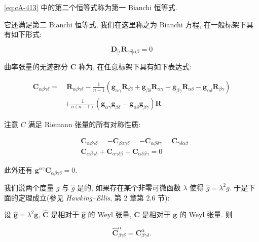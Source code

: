 \eqref{eq:cA-413} 中的第二个恒等式称为第一 Bianchi 恒等式.

它还满足第二 Bianchi 恒等式, 我们在这里称之为 Bianchi 方程, 在一般标架下具有如下形式:

\begin{equation}
\mathbf{D}_{[\epsilon}\mathbf{R}_{\gamma\delta]\alpha\beta} = 0\label{eq:cA-414}
\end{equation}

曲率张量的无迹部分 $\mathbf{C}$ 称为, 在任意标架下具有如下表达式:

\begin{equation}
\begin{aligned}
\mathbf{C}_{\alpha\beta\gamma\delta} = &\ \mathbf{R}_{\alpha\beta\gamma\delta} - \frac{1}{n-1}\left(\mathbf{g}_{\alpha\gamma}\mathbf{R}_{\beta\delta} + \mathbf{g}_{\beta\delta}\mathbf{R}_{\alpha\gamma} - \mathbf{g}_{\beta\gamma}\mathbf{R}_{\alpha\delta} - \mathbf{g}_{\alpha\delta}\mathbf{R}_{\beta\gamma}\right) \\
& + \frac{1}{n(n-1)}(\mathbf{g}_{\alpha\gamma}\mathbf{g}_{\beta\delta} - \mathbf{g}_{\alpha\delta}\mathbf{g}_{\beta\gamma})\mathbf{R}
\end{aligned}\label{eq:cA-415}
\end{equation}

注意 $C$ 满足 Riemann 张量的所有对称性质:

\begin{equation}
\begin{aligned}
& \mathbf{C}_{\alpha\beta\gamma\delta} = -\mathbf{C}_{\beta\alpha\gamma\delta} = -\mathbf{C}_{\alpha\beta\delta\gamma} = \mathbf{C}_{\gamma\delta\alpha\beta} \\
& \mathbf{C}_{\alpha\beta\gamma\delta} + \mathbf{C}_{\alpha\gamma\delta\beta} + \mathbf{C}_{\alpha\delta\beta\gamma} = 0
\end{aligned}\label{eq:cA-416}
\end{equation}

此外还有 $\mathbf{g}^{\alpha\gamma}\mathbf{C}_{\alpha\beta\gamma\delta} = 0$.

我们说两个度量 $g$ 与 $\hat{g}$ 是的, 如果存在某个非零可微函数 $\lambda$ 使得 $\hat{g} = \lambda^{2}g$. 于是下面的定理成立(参见 \emph{Hawking--Ellis}, 第 2 章第 2.6 节):

\begin{theorem}\label{thm:cA-3.1}
设 $\hat{\mathbf{g}} = \lambda^2\mathbf{g}$, $\hat{\mathbf{C}}$ 是相对于 $\hat{\mathbf{g}}$ 的 Weyl 张量, $\mathbf{C}$ 是相对于 $\mathbf{g}$ 的 Weyl 张量. 则

\[
\hat{\mathbf{C}}^{\alpha}_{\beta\gamma\delta} = \mathbf{C}^{\alpha}_{\beta\gamma\delta}.
\]
\end{theorem}

